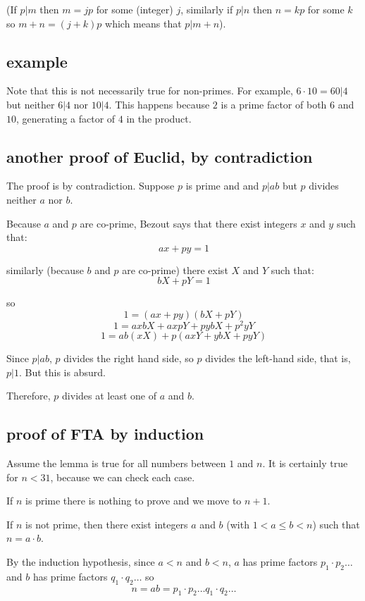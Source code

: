 \documentclass[11pt, oneside]{article}
\begin{document}
(If $p | m$ then $m = jp$ for some (integer) $j$, similarly if $p | n$ then $n = kp$ for some $k$ so $m + n = (j + k)p$ which means that $p | m + n$).

\subsection*{example}

Note that this is not necessarily true for non-primes.  For example, $6 \cdot 10 = 60 | 4$ but neither $6 | 4$ nor $10 | 4$.  This happens because $2$ is a prime factor of both $6$ and $10$, generating a factor of $4$ in the product.

\subsection*{another proof of Euclid, by contradiction}

The proof is by contradiction.  Suppose $p$ is prime and and $p | ab$ but $p$ divides neither $a$ nor $b$.

Because $a$ and $p$ are co-prime, Bezout says that there exist integers $x$ and $y$ such that:
\[ ax + py = 1 \]

similarly (because $b$ and $p$ are co-prime) there exist $X$ and $Y$ such that:
\[ bX + pY = 1 \]
    
so
\[ 1 = (ax + py)(bX + pY) \]
\[ 1 = axbX + axpY + pybX + p^2yY \]
\[ 1 = ab(xX) + p(axY + ybX + pyY) \]
    
Since $p | ab$, $p$ divides the right hand side, so $p$ divides the left-hand side, that is, $p | 1$.  But this is absurd.  

Therefore,  $p$ divides at least one of $a$ and $b$.

\subsection*{proof of FTA by induction}

Assume the lemma is true for all numbers between $1$ and $n$. It is certainly true for $n < 31$, because we can check each case.

If $n$ is prime there is nothing to prove and we move to $n + 1$.

If $n$ is not prime, then there exist integers $a$ and $b$ (with $1 < a \le b < n$) such that $n = a \cdot b$.

By the induction hypothesis, since $a < n$ and $b < n$, $a$ has prime factors $p_1 \cdot p_2 \dots$ and $b$ has prime factors $q_1 \cdot q_2 \dots$ so
\[ n = ab = p_1 \cdot p_2 \dots  q_1 \cdot q_2 \dots \]
\end{document}
